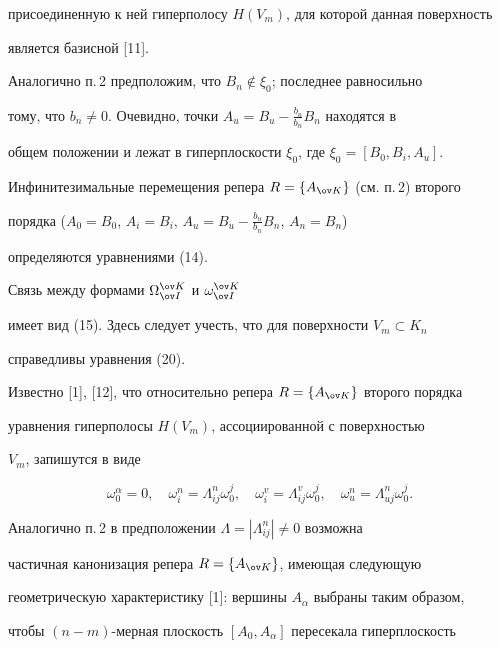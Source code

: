 присоединенную к ней гиперполосу $H(V_m)$, для которой данная поверхность 


является базисной [11]. 


 


Аналогично п.\,2 предположим, что $B_n\notin\xi_0$; последнее равносильно 


тому, что $b_n\ne0$. Очевидно, точки $A_u=B_u-\frac{b_u}{b_n}B_n$ находятся в 


общем положении и лежат в гиперплоскости $\xi_0$, где $\xi_0=[B_0,B_i,A_u]$. 


 


Инфинитезимальные перемещения репера $R=\{A_{\ov K}\}$ (см. п.\,2) второго 


порядка ($A_0=B_0$, $A_i=B_i$, $A_u=B_u-\frac{b_u}{b_n}B_n$, $A_n=B_n$) 


определяются уравнениями (14). 


 


Связь между формами $\Omega^{\ov K}_{\ov I}$ и $\omega^{\ov K}_{\ov I}$ 


имеет вид (15). Здесь следует учесть, что для поверхности $V_m\subset K_n$ 


справедливы уравнения (20). 


 


Известно [1], [12], что относительно репера $R=\{A_{\ov K}\}$ второго порядка 


уравнения гиперполосы $H(V_m)$, ассоциированной с поверхностью 


$V_m$, запишутся в виде 


$$ 


\omega^\alpha_0=0,\quad \omega^n_i=\Lambda^n_{ij}\omega^j_0,\quad 


\omega^v_i=\Lambda^v_{ij}\omega^j_0,\quad \omega^n_u= 


\Lambda^n_{uj}\omega^j_0. 


$$ 


 


Аналогично п.\,2 в предположении $\Lambda=|\Lambda^n_{ij}|\ne0$ возможна 


частичная канонизация репера $R=\{A_{\ov K}\}$, имеющая следующую 


геометрическую характеристику [1]: вершины $A_\alpha$ выбраны таким образом, 


чтобы $(n-m)$-мерная плоскость $[A_0,A_\alpha]$ пересекала гиперплоскость 


